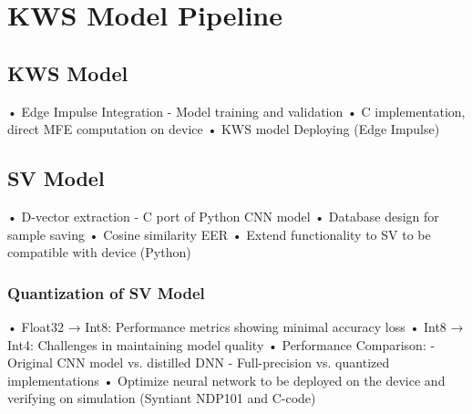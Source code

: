 \chapter{KWS Model Pipeline}
\label{cha:implementation} 
\section{KWS Model}
\label{sec:kws deployment}
• Edge Impulse Integration - Model training and validation\newline
• C implementation, direct MFE computation on device\newline
• KWS model Deploying (Edge Impulse)\newline

\section{SV Model}
\label{sec:sv implementation}
• D-vector extraction - C port of Python CNN model \newline
• Database design for sample saving \newline
• Cosine similarity EER \newline
• Extend functionality to SV to be compatible with device (Python)\newline

\subsection{Quantization of SV Model}
\label{sec:quantization}
• Float32 → Int8: Performance metrics showing minimal accuracy loss\newline
• Int8 → Int4: Challenges in maintaining model quality\newline
• Performance Comparison:\newline
    - Original CNN model vs. distilled DNN\newline
    - Full-precision vs. quantized implementations\newline
• Optimize neural network to be deployed on the device and verifying on simulation (Syntiant NDP101 and C-code)\newline\newline

\newpage